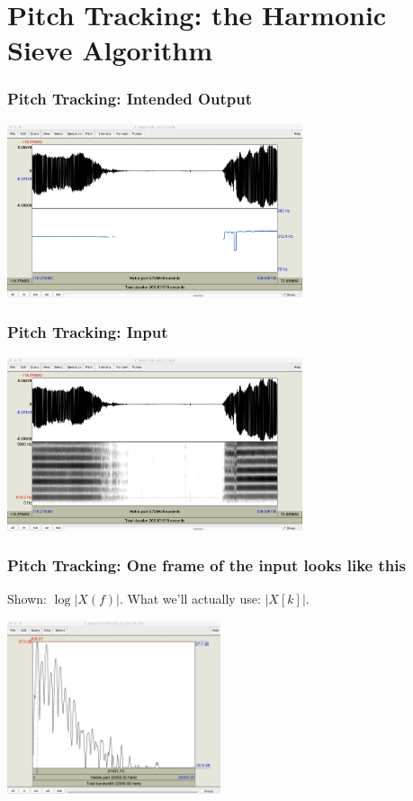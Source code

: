 \documentclass{beamer}
\begin{document}
\section[Pitch Tracking]{Pitch Tracking: the Harmonic Sieve Algorithm}
\setcounter{subsection}{1}

\begin{frame}
  \frametitle{Pitch Tracking: Intended Output}
  \centerline{\includegraphics[height=2in]{violin_notes.png}}
\end{frame}

\begin{frame}
  \frametitle{Pitch Tracking: Input}
  \centerline{}
  \centerline{\includegraphics[height=2in]{violin_spectrogram.png}}
\end{frame}

\begin{frame}
  \frametitle{Pitch Tracking: One frame of the input looks like this}

  Shown: $\log |X(f)|$.  What we'll actually use: $|X[k]|$.
  
  \centerline{\includegraphics[height=2in]{violin_spectral_slice.png}}
\end{frame}
\end{document}
